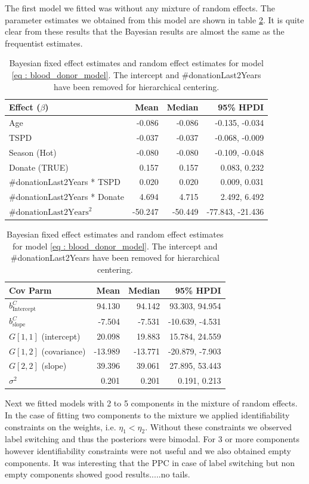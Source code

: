 The first model we fitted was without any mixture of random effects. The parameter estimates we obtained from this model are shown in table \ref{table : bayesian fixed effects}. It is quite clear from these results that the Bayesian results are almost the same as the frequentist estimates.

\begin{table}[!htb]
\centering
\caption{Bayesian fixed effect estimates and random effect estimates for model \ref{eq : blood_donor_model}. The intercept and \#donationLast2Years have been removed for hierarchical centering.}
\label{table : bayesian fixed effects}
\begin{tabular}{@{}lrrr@{}}
\toprule
Effect ($\beta$) & Mean & Median & 95\% HPDI \\ \midrule
Age & -0.086 & -0.086 & -0.135, -0.034\\
TSPD & -0.037 & -0.037 & -0.068, -0.009 \\
Season (Hot) & -0.080 & -0.080 & -0.109, -0.048\\
Donate (TRUE) & 0.157 & 0.157 & 0.083, 0.232 \\
\#donationLast2Years * TSPD & 0.020 & 0.020 & 0.009, 0.031  \\
\#donationLast2Years * Donate & 4.694 & 4.715 & 2.492, 6.492 \\
$\text{\#donationLast2Years}^2$ & -50.247 & -50.449 & -77.843, -21.436 \\ \bottomrule
\end{tabular}

\begin{tabular}{@{}lrrr@{}}
\toprule
Cov Parm & Mean & Median & 95\% HPDI \\ \midrule
$b_{\text{Intercept}}^C$& 94.130 & 94.142 & 93.303, 94.954\\
$b_{\text{slope}}^C$ & -7.504 & -7.531 & -10.639, -4.531\\
$G[1,1]$ (intercept) & 20.098 & 19.883 & 15.784, 24.559\\
$G[1,2]$ (covariance) & -13.989 & -13.771 & -20.879, -7.903\\
$G[2,2]$ (slope) & 39.396 & 39.061 & 27.895, 53.443\\
$\sigma^2$ & 0.201 & 0.201 & 0.191, 0.213\\ \bottomrule
\end{tabular}
\end{table}

Next we fitted models with 2 to 5 components in the mixture of random effects. In the case of fitting two components to the mixture we applied identifiability constraints on the weights, i.e. $\eta_1 < \eta_2$. Without these constraints we observed label switching and thus the posteriors were bimodal. For 3 or more components however identifiability constraints were not useful and we also obtained empty components. It was interesting that the PPC in case of label switching but non empty components showed good results.....no tails.


